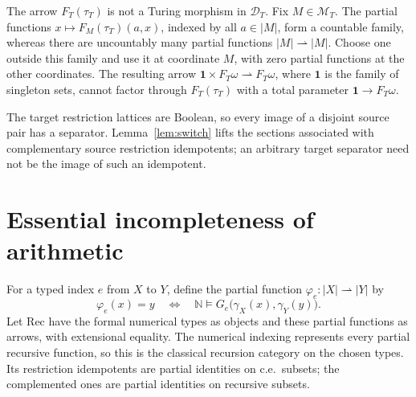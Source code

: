 \documentclass[11pt]{article}
\newcommand{\N}{\mathbb N}
\begin{document}
The arrow $F_T(\tau_T)$ is not a Turing morphism in $\mathcal D_T$.
Fix $M\in\mathcal M_T$. The partial functions
$x\mapsto F_M(\tau_T)(a,x)$, indexed by all $a\in|M|$, form a
countable family, whereas there are uncountably many partial
functions $|M|\rightharpoonup|M|$.
Choose one outside this family and use it at coordinate $M$,
with zero partial functions at the other coordinates.
The resulting arrow
$\mathbf1\times F_T\omega\rightharpoonup F_T\omega$,
where $\mathbf1$ is the family of singleton sets, cannot factor
through $F_T(\tau_T)$ with a total parameter
$\mathbf1\to F_T\omega$.

The target restriction lattices are Boolean, so every image of a disjoint source
pair has a separator. Lemma~\ref{lem:switch} lifts the sections
associated with complementary source restriction idempotents;
an arbitrary target separator need not be the image of such an
idempotent.

\section{Essential incompleteness of arithmetic}\label{sec:arithmetic}

For a typed index $e$ from $X$ to $Y$, define the partial function
$\varphi_e:|X|\rightharpoonup|Y|$ by
\[
 \varphi_e(x)=y\quad\Longleftrightarrow\quad
 \N\models G_e\bigl(\gamma_X(x),\gamma_Y(y)\bigr).
\]
Let $\mathrm{Rec}$ have the formal numerical types as objects and
these partial functions as arrows, with extensional equality.
The numerical indexing represents every partial recursive function,
so this is the classical recursion category on the chosen types.
Its restriction idempotents are partial identities on c.e.\ subsets;
the complemented ones are partial identities on recursive subsets.
\end{document}
